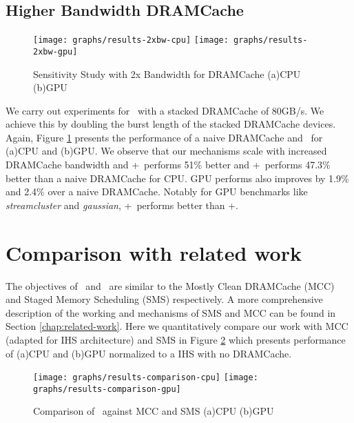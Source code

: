 \subsection{Higher Bandwidth DRAMCache}

\begin{figure}[!htb]
	\centering
	\texttt{[image: graphs/results-2xbw-cpu]}
	\texttt{[image: graphs/results-2xbw-gpu]}
	\caption{Sensitivity Study with 2x Bandwidth for DRAMCache (a)CPU (b)GPU}
	\label{results-ddr3-2133}
\end{figure}

We carry out experiments for \cachename\ with a stacked DRAMCache of 80GB/s. We achieve this by doubling the burst length of the stacked DRAMCache devices. Again, Figure \ref{results-ddr3-2133}  presents the performance of a naive DRAMCache and \cachename\ for (a)CPU and (b)GPU. We observe that our mechanisms scale with increased DRAMCache bandwidth and \bypassname+\prioname\ performs 51\% better and \chaining+\prioname\ performs 47.3\% better than a naive DRAMCache for CPU. GPU performs also improves by 1.9\% and 2.4\% over a naive DRAMCache. Notably for GPU benchmarks like \textit{streamcluster} and \textit{gaussian}, \chaining+\prioname\ performs better than \bypassname+\prioname.

\section{Comparison with related work} \label{comparison}
The objectives of \bypassname\ and \prioname\ are similar to the Mostly Clean DRAMCache (MCC) \cite{mostly-clean} and Staged Memory Scheduling (SMS) \cite{sms} respectively. A more comprehensive description of the working and mechanisms of SMS and MCC can be found in Section \ref{chap:related-work}. Here we quantitatively compare our work with MCC (adapted for IHS architecture) and SMS in Figure \ref{results-comparison} which presents performance of (a)CPU and (b)GPU normalized to a IHS with no DRAMCache. 

\begin{figure}[!htb]
	\centering
	\texttt{[image: graphs/results-comparison-cpu]}
	\texttt{[image: graphs/results-comparison-gpu]}
	\caption{Comparison of \cachename\ against MCC \cite{mostly-clean} and SMS \cite{sms} (a)CPU (b)GPU}
	\label{results-comparison}
\end{figure}

